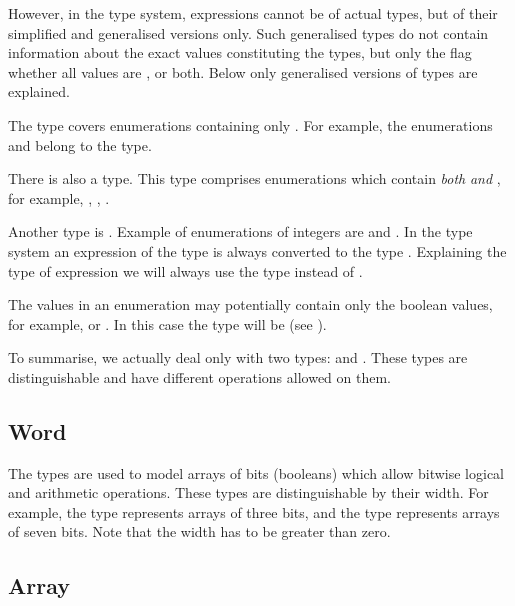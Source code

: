 However, in the \nusmv type system, expressions cannot be of actual
\Enum types, but of their simplified and generalised versions
only. Such generalised \Enum types do not contain information about
the exact values constituting the types, but only the flag whether all
values are  ,
 or both. Below only generalised versions
of \Enum types are explained.

The \SymbEnum type covers enumerations containing only . For example, the enumerations 
and  belong to the \SymbEnum type.

There is also a \IntSymbEnum type. 
This type comprises enumerations which contain \emph{both}
 \emph{and} , for
example, , ,
.

Another \Enum type is \IntEnum.
Example of enumerations of integers are  and . 
In the \nusmv type system an expression of the type \IntEnum
is always converted to the type \Integer. Explaining
the type of expression we will always use the type \Integer
instead of \IntEnum.

The values in an enumeration may potentially contain only the boolean
values, for example,  or . In
this case the type will be \Boolean (see ).

To summarise, we actually deal only with two \Enum types: \SymbEnum and
\IntSymbEnum. These types are distinguishable and have different operations
allowed on them.


\subsection{Word}
\label{Word Type}

The \Word types are used to model arrays of bits (booleans)
which allow bitwise logical and arithmetic operations. These types
are distinguishable by their width. For example, the type
\Word[3] represents arrays of three bits, and the type
\Word[7] represents arrays of seven bits. Note that the width
has to be greater than zero.

\subsection{Array}
\label{Array Type}

